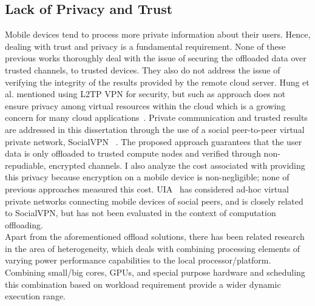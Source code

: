 \subsection{Lack of Privacy and Trust}
\label{intro:lack}
%
Mobile devices tend to process more private information about their
users.
%
Hence, dealing with trust and privacy is a fundamental requirement.
%
None of these previous works thoroughly deal with the issue of securing
the offloaded data over trusted channels, to trusted devices.
%
They also do not address the issue of verifying the integrity of the
results provided by the remote cloud server.
%
Hung et al. mentioned using L2TP VPN for security, but such as approach
does not ensure privacy among virtual resources within the cloud which
is a growing concern for many cloud applications~\cite{brodkin}.
%
Private communication and trusted results are addressed in this
dissertation through the use of a social peer-to-peer virtual
private network, SocialVPN~\cite{socialvpn} . 
%
The proposed approach guarantees that the user data is only offloaded to
trusted compute nodes and verified through non-repudiable, encrypted
channels.
%
I also analyze the cost associated with providing this privacy because
encryption on a mobile device is non-negligible; none of previous
approaches measured this cost.
%
UIA~\cite{uia} has considered ad-hoc virtual private networks connecting
mobile devices of social peers, and is closely related to SocialVPN, but
has not been evaluated in the context of computation offloading.\\
%
Apart from the aforementioned offload solutions, there has been related
research in the area of heterogeneity, which deals with
combining processing elements of varying power performance capabilities
to the local processor/platform.
%
Combining small/big cores, GPUs, and special purpose hardware and
scheduling this combination based on workload requirement provide a
wider dynamic execution range.
%

